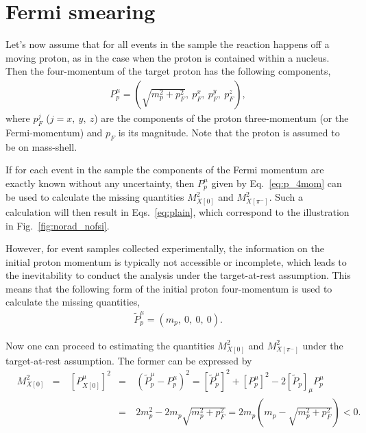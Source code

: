 \section{Fermi smearing}
\mbox{}\vspace{-\baselineskip}

Let's now assume that for all events in the sample the reaction happens off a moving proton, as in the case when the proton is contained within a nucleus. Then the four-momentum of the target proton has the following components, 
\begin{equation}
\begin{aligned}
P_{p}^{\mu} = (\sqrt{m^{2}_{p}+p^{2}_{F}},~p_{F}^{x},~p_{F}^{y},~p_{F}^{z}),
\end{aligned}\label{eq:p_4mom}
\end{equation}
where $p_{F}^{j}$ ($j=x,~y,~z$) are the components of the proton three-momentum (or the Fermi-momentum) and $p_{F}$ is its magnitude. Note that the proton is assumed to be on mass-shell.

If for each event in the sample the components of the Fermi momentum are exactly known without any uncertainty, then $P_{p}^{\mu}$ given by Eq.~\eqref{eq:p_4mom} can be used to calculate the missing quantities $M_{X[0]}^{2}$ and $M_{X[\pi^{-}]}^{2}$. Such a calculation will then result in Eqs.~\eqref{eq:plain}, which correspond to the illustration in Fig.~\ref{fig:norad_nofsi}. 


However, for event samples collected experimentally, the information on the initial proton momentum is typically not accessible or incomplete, which leads to the inevitability to conduct the analysis under the target-at-rest assumption. This means that the following form of the initial proton four-momentum is used to calculate the missing quantities,
\begin{equation}
\begin{aligned}
\widetilde{P}_{p}^{\mu} = (m_{p},~0,~0,~0).
\end{aligned}\label{eq:p_4mom_rest}
\end{equation}

Now one can proceed to estimating the quantities $M_{X[0]}^{2}$ and $M_{X[\pi^{-}]}^{2}$ under the target-at-rest assumption. The former can be expressed by
\begin{equation}
\begin{aligned}
&M_{X[0]}^{2}&=&~\left [P_{X[0]}^{\mu} \right ]^{2}&=&~ \left (\widetilde{P}^{\mu}_{p} - P^{\mu}_{p} \right )^{2}=[\widetilde{P}^{\mu}_{p} ]^{2} + [P^{\mu}_{p}]^{2}-2 [\widetilde{P}_{p} ]_{\mu} P_{p}^{\mu}\\
&&&&=&~2m_{p}^{2}-2m_{p}\sqrt{m_{p}^{2}+p_{F}^{2}}=2m_{p}\left (m_{p} - \sqrt{m_{p}^{2}+p_{F}^{2}} \right ) < 0.
\end{aligned}\label{eq:mm0_fermi}
\end{equation}

